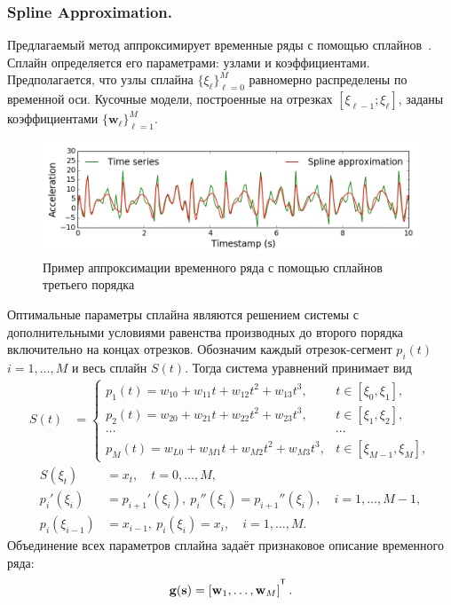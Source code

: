 \subsubsection{Spline Approximation.}
Предлагаемый метод аппроксимирует временные ряды с помощью сплайнов~\cite{deboor1978splines}. Сплайн определяется его параметрами: узлами и коэффициентами.
Предполагается, что узлы сплайна $\{\xi_\ell\}_{\ell=0}^M$ равномерно распределены по временной оси.
Кусочные модели, построенные на отрезках $[\xi_{\ell-1}; \xi_{\ell}]$, заданы коэффициентами $\{\mathbf{w}_\ell\}_{\ell=1}^{M}$.
\begin{figure}[h]
	\centering
	\includegraphics[width=1\linewidth]{figs/ch6/spline_example.png}
	\caption{Пример аппроксимации временного ряда с помощью сплайнов третьего порядка}
	\label{ch6:fig:spline_example}
\end{figure}
Оптимальные параметры сплайна являются решением системы с дополнительными условиями равенства производных до второго порядка включительно на концах отрезков.
Обозначим каждый отрезок-сегмент $p_i(t)$ $i = 1, \dots, M$ и весь сплайн $S(t)$. Тогда система уравнений принимает вид
\begin{align*}
	S(t) &= \begin{cases}
		p_1(t) = w_{10} +w_{11}t + w_{12}t^2 + w_{13}t^3, & t\in [\xi_0, \xi_1],\\
		p_2(t) = w_{20} +w_{21}t + w_{22}t^2 + w_{23}t^3, & t\in [\xi_1, \xi_2],\\
		\cdots&\cdots \\
		p_{M}(t) = w_{L0} +w_{M1}t + w_{M2}t^2 + w_{M3}t^3, & t\in [\xi_{M-1}, \xi_M],					
	\end{cases}
\end{align*}
\begin{align*}
	S(\xi_t) &= x_t, \quad t = 0, \dots, M,\\
	p_i'(\xi_i) &= p_{i+1}'(\xi_i),\: p_i''(\xi_i) = p_{i+1}''(\xi_i), \quad i = 1, \dots, M-1,\\
	p_i(\xi_{i-1}) &= x_{i-1},\: p_i(\xi_i) = x_i, \quad i = 1, \dots, M.
\end{align*}
Объединение всех параметров сплайна задаёт признаковое описание временного ряда:
\[
	\mathbf{g}(\bs) = \left[\mathbf{w}_1, \dots, \mathbf{w}_{M}\right]^{\T}.
\]

